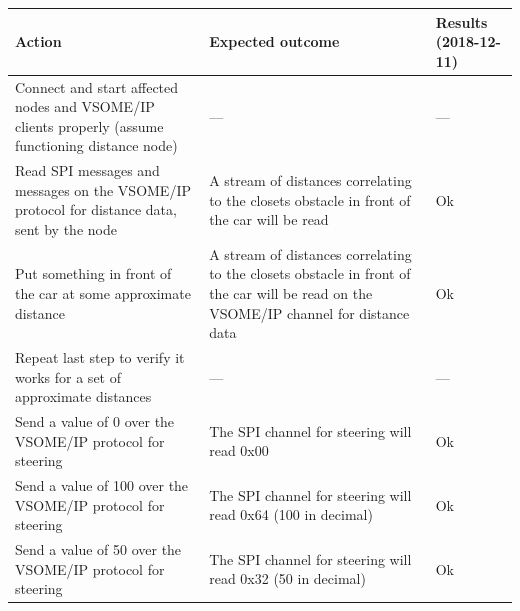 \documentclass[11pt, titlepage]{article} %
\begin{document}
\begin{table}[H]
 \label{tab:title}
\centering
\begin{tabular}{|m{5cm}|m{5cm}|m{5cm}|}
\hline
Action & Expected outcome & Results (2018-12-11) \\ \hline
Connect and start affected nodes and VSOME/IP clients properly (assume functioning distance node)  &  ---     & ---  \\ \hline
Read SPI messages and messages on the VSOME/IP protocol for distance data, sent by the node  &  A stream of distances correlating to the closets obstacle in front of the car will be read     & Ok  \\ \hline
Put something in front of the car at some approximate distance  & A stream of distances correlating to the closets obstacle in front of the car will be read on the VSOME/IP channel for distance data      & Ok  \\ \hline
Repeat last step to verify it works for a set of approximate distances  &  ---     & ---  \\ \hline
Send a value of 0 over the VSOME/IP protocol for steering  &  The SPI channel for steering will read 0x00     & Ok  \\ \hline
Send a value of 100 over the VSOME/IP protocol for steering  & The SPI channel for steering will read 0x64 (100 in decimal)      & Ok  \\ \hline
Send a value of 50 over the VSOME/IP protocol for steering  &  The SPI channel for steering will read 0x32 (50 in decimal)     & Ok  \\ \hline

\end{tabular}
\end{table}
\end{document}
